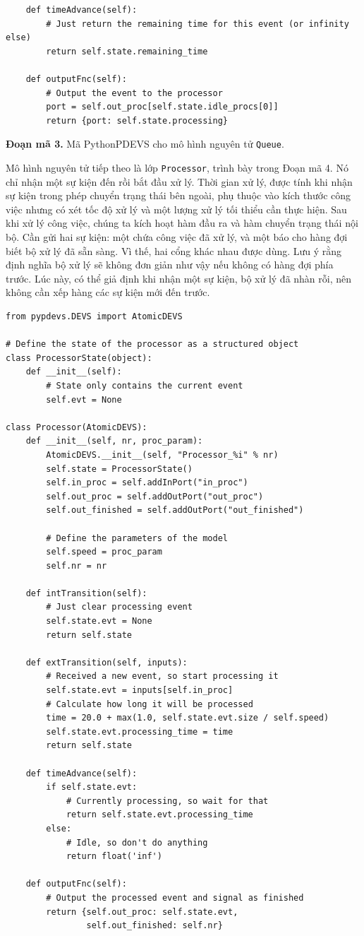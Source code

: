 \begin{verbatim}
    def timeAdvance(self):
        # Just return the remaining time for this event (or infinity else)
        return self.state.remaining_time

    def outputFnc(self):
        # Output the event to the processor
        port = self.out_proc[self.state.idle_procs[0]]
        return {port: self.state.processing}
\end{verbatim}
\noindent\textbf{Đoạn mã 3.} Mã PythonPDEVS cho mô hình nguyên tử \texttt{Queue}.

Mô hình nguyên tử tiếp theo là lớp \texttt{Processor}, trình bày trong Đoạn mã 4. Nó chỉ nhận một sự kiện đến rồi bắt đầu xử lý. Thời gian xử lý, được tính khi nhận sự kiện trong phép chuyển trạng thái bên ngoài, phụ thuộc vào kích thước công việc nhưng có xét tốc độ xử lý và một lượng xử lý tối thiểu cần thực hiện. Sau khi xử lý công việc, chúng ta kích hoạt hàm đầu ra và hàm chuyển trạng thái nội bộ. Cần gửi hai sự kiện: một chứa công việc đã xử lý, và một báo cho hàng đợi biết bộ xử lý đã sẵn sàng. Vì thế, hai cổng khác nhau được dùng. Lưu ý rằng định nghĩa bộ xử lý sẽ không đơn giản như vậy nếu không có hàng đợi phía trước. Lúc này, có thể giả định khi nhận một sự kiện, bộ xử lý đã nhàn rỗi, nên không cần xếp hàng các sự kiện mới đến trước.
\begin{verbatim}
from pypdevs.DEVS import AtomicDEVS

# Define the state of the processor as a structured object
class ProcessorState(object):
    def __init__(self):
        # State only contains the current event
        self.evt = None

class Processor(AtomicDEVS):
    def __init__(self, nr, proc_param):
        AtomicDEVS.__init__(self, "Processor_%i" % nr)
        self.state = ProcessorState()
        self.in_proc = self.addInPort("in_proc")
        self.out_proc = self.addOutPort("out_proc")
        self.out_finished = self.addOutPort("out_finished")

        # Define the parameters of the model
        self.speed = proc_param
        self.nr = nr

    def intTransition(self):
        # Just clear processing event
        self.state.evt = None
        return self.state

    def extTransition(self, inputs):
        # Received a new event, so start processing it
        self.state.evt = inputs[self.in_proc]
        # Calculate how long it will be processed
        time = 20.0 + max(1.0, self.state.evt.size / self.speed)
        self.state.evt.processing_time = time
        return self.state

    def timeAdvance(self):
        if self.state.evt:
            # Currently processing, so wait for that
            return self.state.evt.processing_time
        else:
            # Idle, so don't do anything
            return float('inf')

    def outputFnc(self):
        # Output the processed event and signal as finished
        return {self.out_proc: self.state.evt,
                self.out_finished: self.nr}
\end{verbatim}
